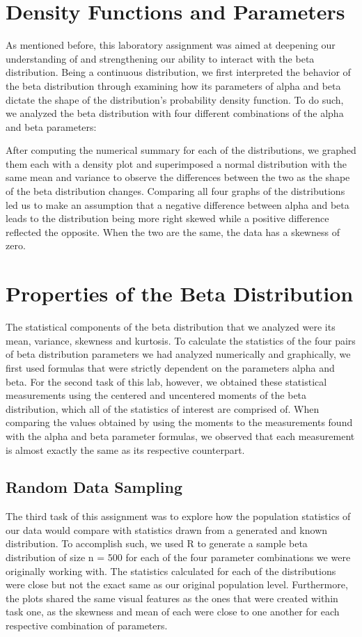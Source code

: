 \documentclass{article}\usepackage[]{graphicx}\usepackage[]{xcolor}
\begin{document}
\begin{multicols}{2}
\section{Density Functions and Parameters}
As mentioned before, this laboratory assignment was aimed at deepening our understanding of and strengthening our ability to interact with the beta distribution. Being a continuous distribution, we first interpreted the behavior of the beta distribution through examining how its parameters of alpha and beta dictate the shape of the distribution's probability density function. To do such, we analyzed the beta distribution with four different combinations of the alpha and beta parameters:


After computing the numerical summary for each of the distributions, we graphed them each with a density plot and superimposed a normal distribution with the same mean and variance to observe the differences between the two as the shape of the beta distribution changes. Comparing all four graphs of the distributions led us to make an assumption that a negative difference between alpha and beta leads to the distribution being more right skewed while a positive difference reflected the opposite. When the two are the same, the data has a skewness of zero.



\section{Properties of the Beta Distribution}
The statistical components of the beta distribution that we analyzed were its mean, variance, skewness and kurtosis. To calculate the statistics of the four pairs of beta distribution parameters we had analyzed numerically and graphically, we first used formulas that were strictly dependent on the parameters alpha and beta. For the second task of this lab, however, we obtained these statistical measurements using the centered and uncentered moments of the beta distribution, which all of the statistics of interest are comprised of.  When comparing the values obtained by using the moments to the measurements found with the alpha and beta parameter formulas, we observed that each measurement is almost exactly the same as its respective counterpart. 

\subsection{Random Data Sampling}
The third task of this assignment was to explore how the population statistics of our data would compare with statistics drawn from a generated and known distribution. To accomplish such, we used R to generate a sample beta distribution of size n = 500 for each of the four parameter combinations we were originally working with. The statistics calculated for each of the distributions were close but not the exact same as our original population level. Furthermore, the plots shared the same visual features as the ones that were created within task one, as the skewness and mean of each were close to one another for each respective combination of parameters.


\end{multicols}
\end{document}
